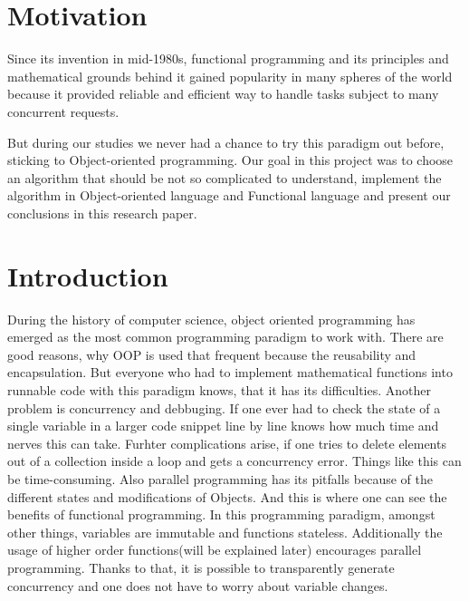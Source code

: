 \section{Motivation}

Since its invention in mid-1980s,
functional programming and its principles and mathematical grounds behind it 
gained popularity in many spheres of the world because 
it provided reliable and efficient way to 
handle tasks subject to many concurrent requests.

But during our studies we never had a chance to try this paradigm out before,
sticking to Object-oriented programming. 
Our goal in this project was to choose an algorithm that should be not so complicated to understand,
implement the algorithm in Object-oriented language and Functional language and present our conclusions in this research paper.



\section{Introduction}
During the history of computer science, 
object oriented programming has emerged as the most 
common programming paradigm to work with. 
There are good reasons, why OOP is used that frequent 
because the reusability and encapsulation. 
But everyone who had to implement 
mathematical functions into runnable 
code with this paradigm knows, that it has its difficulties. 
Another problem is concurrency and debbuging. 
If one ever had to check the state of a single 
variable in a larger code snippet line by line 
knows how much time and nerves this can take. 
Furhter complications arise, 
if one tries to delete elements out of a 
collection inside a loop and gets a concurrency error. 
Things like this can be time-consuming. 
Also parallel programming has its pitfalls because of the different 
states and modifications of Objects. 
And this is where one can see the benefits of functional programming. 
In this programming paradigm, amongst other things, 
variables are immutable and functions stateless. 
Additionally the usage of higher order functions(will be explained later) 
encourages parallel programming. 
Thanks to that, it is possible to transparently 
generate concurrency and one does not have to worry about variable changes.\\
